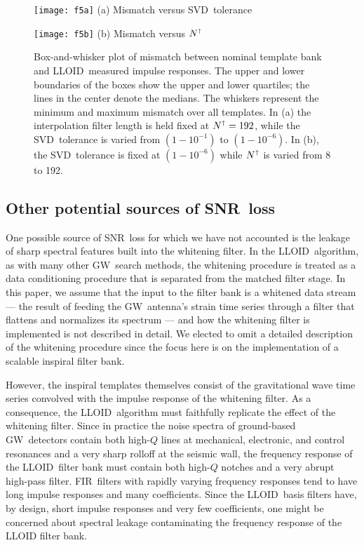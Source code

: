 \documentclass[preprint2]{aastex}
\newcommand{\GW}{GW}%
\newcommand{\SNR}{SNR}%
\newcommand{\SVD}{SVD}%
\newcommand{\fir}{FIR}%
\newcommand{\lloid}{LLOID}%
\begin{document}
\begin{figure*}[b]
	\begin{minipage}[t]{0.5\textwidth}
		\begin{center}
			\texttt{[image: f5a]}
			(a) Mismatch versus \SVD\ tolerance
		\end{center}
	\end{minipage}
	\begin{minipage}[t]{0.5\textwidth}
		\begin{center}
			\texttt{[image: f5b]}
			(b) Mismatch versus $N^\shortuparrow$
		\end{center}
	\end{minipage}
	\caption{\label{fig:bw}Box-and-whisker plot of mismatch between nominal
template bank and \lloid\ measured impulse responses.  The upper and lower boundaries of
the boxes show the upper and lower quartiles; the lines in the center denote the medians.
The whiskers represent the minimum and maximum mismatch over all templates.  In 
(a) the interpolation filter length is held fixed at $N^\shortuparrow = 192$, while
the \SVD\ tolerance is varied from $\left(1-10^{-1}\right)$ to $\left(1-10^{-6}\right)$.
In (b), the \SVD\ tolerance is fixed at $\left(1-10^{-6}\right)$ while $N^\shortuparrow$
is varied from 8 to 192.}
\end{figure*}

\subsection{Other potential sources of \SNR\ loss}

One possible source of \SNR\ loss for which we have not accounted is the leakage of sharp spectral features built into the whitening filter.  In the \lloid\ algorithm, as with many other \GW\ search methods, the whitening procedure is treated as a data conditioning procedure that is separated from the matched filter stage.  In this paper, we assume that the input to the filter bank is a whitened data stream --- the result of feeding the \GW\ antenna's strain time series through a filter that flattens and normalizes its spectrum --- and how the whitening filter is implemented is not described in detail.  We elected to omit a detailed description of the whitening procedure since the focus here is on the implementation of a scalable inspiral filter bank.

However, the inspiral templates themselves consist of the gravitational wave time series convolved with the impulse response of the whitening filter.  As a consequence, the \lloid\ algorithm must faithfully replicate the effect of the whitening filter.  Since in practice the noise spectra of ground-based \GW\ detectors contain both high-$Q$ lines at mechanical, electronic, and control resonances and a very sharp rolloff at the seismic wall, the frequency response of the \lloid\ filter bank must contain both high-$Q$ notches and a very abrupt high-pass filter.  \fir\ filters with rapidly varying frequency responses tend to have long impulse responses and many coefficients.  Since the \lloid\ basis filters have, by design, short impulse responses and very few coefficients, one might be concerned about spectral leakage contaminating the frequency response of the LLOID filter bank.
\end{document}
